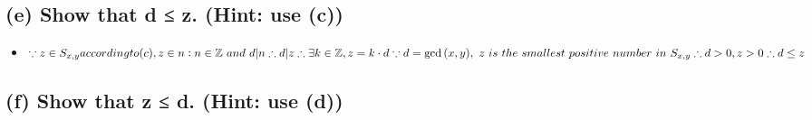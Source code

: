 \documentclass{article}
\begin{document}
\subsection*{(e) Show that d ≤ z. (Hint: use (c))}

\begin{itemize}
    \item[]
       $ \because z \in S_{x,y}\\
        according to (c), z \in {n:n \in \mathbb{Z}\ and\ d \vert n}\\
    \therefore d \vert z\\
    \therefore \exists k \in \mathbb{Z},z=k \cdot d\\
    \because d=\gcd{(x,y)},\ z\ is\ the\ smallest\ positive\ number\ in\ S_{x,y}\\
    \therefore d>0,z>0\\
    \therefore d \le z$

\end{itemize}

\subsection*{(f) Show that z ≤ d. (Hint: use (d))}
\end{document}
